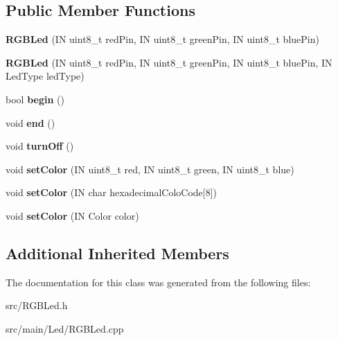 \subsection*{Public Member Functions}
\begin{DoxyCompactItemize}
\item 
\mbox{\label{class_easyuino_1_1_r_g_b_led_a3580be3110cebddcd06917994ebdb8ad}} 
{\bfseries R\+G\+B\+Led} (IN uint8\+\_\+t red\+Pin, IN uint8\+\_\+t green\+Pin, IN uint8\+\_\+t blue\+Pin)
\item 
\mbox{\label{class_easyuino_1_1_r_g_b_led_a85c5af3b8b5288d7b45eabcf4fc71aba}} 
{\bfseries R\+G\+B\+Led} (IN uint8\+\_\+t red\+Pin, IN uint8\+\_\+t green\+Pin, IN uint8\+\_\+t blue\+Pin, IN Led\+Type led\+Type)
\item 
\mbox{\label{class_easyuino_1_1_r_g_b_led_abdc3512266c7f584609147fccc1ec816}} 
bool {\bfseries begin} ()
\item 
\mbox{\label{class_easyuino_1_1_r_g_b_led_ad0e9fb0da405c537e876c8a2dc22246e}} 
void {\bfseries end} ()
\item 
\mbox{\label{class_easyuino_1_1_r_g_b_led_a100140fa6d32e190f68cdc1e24c3aba0}} 
void {\bfseries turn\+Off} ()
\item 
\mbox{\label{class_easyuino_1_1_r_g_b_led_a4c113ab3fbbd2a75f020a902355faa3e}} 
void {\bfseries set\+Color} (IN uint8\+\_\+t red, IN uint8\+\_\+t green, IN uint8\+\_\+t blue)
\item 
\mbox{\label{class_easyuino_1_1_r_g_b_led_a66ad7b78c2ae636c077519950952206c}} 
void {\bfseries set\+Color} (IN char hexadecimal\+Colo\+Code\mbox{[}8\mbox{]})
\item 
\mbox{\label{class_easyuino_1_1_r_g_b_led_a5b8365a4191bbe0a092ba30996a37b13}} 
void {\bfseries set\+Color} (IN Color color)
\end{DoxyCompactItemize}
\subsection*{Additional Inherited Members}


The documentation for this class was generated from the following files\+:\begin{DoxyCompactItemize}
\item 
src/R\+G\+B\+Led.\+h\item 
src/main/\+Led/R\+G\+B\+Led.\+cpp\end{DoxyCompactItemize}
